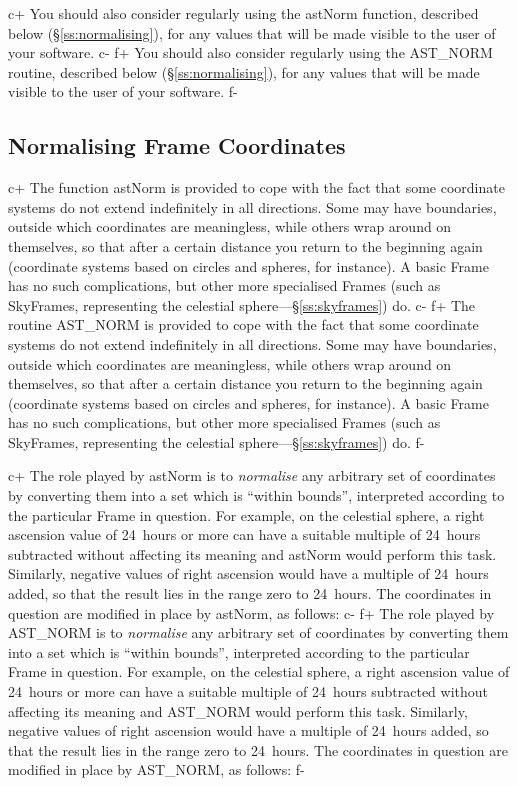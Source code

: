 \documentclass[twoside,11pt]{starlink}
\providecommand{\secref}[1]{\S\ref{#1}}
\begin{document}
c+
You should also consider regularly using the astNorm function,
described below (\secref{ss:normalising}), for any values that will be
made visible to the user of your software.
c-
f+
You should also consider regularly using the AST\_NORM routine,
described below (\secref{ss:normalising}), for any values that will be
made visible to the user of your software.
f-

\subsection{\label{ss:normalising}Normalising Frame Coordinates}

c+
The function astNorm is provided to cope with the fact that some
coordinate systems do not extend indefinitely in all directions. Some
may have boundaries, outside which coordinates are meaningless, while
others wrap around on themselves, so that after a certain distance you
return to the beginning again (coordinate systems based on circles and
spheres, for instance). A basic Frame has no such complications, but
other more specialised Frames (such as SkyFrames, representing the
celestial sphere---\secref{ss:skyframes}) do.
c-
f+
The routine AST\_NORM is provided to cope with the fact that some
coordinate systems do not extend indefinitely in all directions. Some
may have boundaries, outside which coordinates are meaningless, while
others wrap around on themselves, so that after a certain distance you
return to the beginning again (coordinate systems based on circles and
spheres, for instance). A basic Frame has no such complications, but
other more specialised Frames (such as SkyFrames, representing the
celestial sphere---\secref{ss:skyframes}) do.
f-

c+
The role played by astNorm is to \emph{normalise} any arbitrary set of
coordinates by converting them into a set which is ``within bounds'',
interpreted according to the particular Frame in question. For
example, on the celestial sphere, a right ascension value of 24~hours
or more can have a suitable multiple of 24~hours subtracted without
affecting its meaning and astNorm would perform this task. Similarly,
negative values of right ascension would have a multiple of 24~hours
added, so that the result lies in the range zero to 24~hours. The
coordinates in question are modified in place by astNorm, as follows:
c-
f+
The role played by AST\_NORM is to \emph{normalise} any arbitrary set
of coordinates by converting them into a set which is ``within
bounds'', interpreted according to the particular Frame in
question. For example, on the celestial sphere, a right ascension
value of 24~hours or more can have a suitable multiple of 24~hours
subtracted without affecting its meaning and AST\_NORM would perform
this task. Similarly, negative values of right ascension would have a
multiple of 24~hours added, so that the result lies in the range zero
to 24~hours. The coordinates in question are modified in place by
AST\_NORM, as follows:
f-
\end{document}
